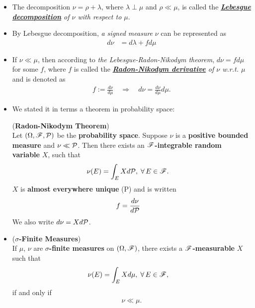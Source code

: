 \documentclass[11pt]{article}
\begin{document}
\begin{itemize}
\item
\begin{definition}
 The decomposition $\nu= \rho + \lambda$, where $\lambda \perp \mu$ and $\rho\ll \mu$, is called the \emph{\textbf{\underline{Lebesgue} \underline{decomposition}} of $\nu$ with respect to $\mu$}.
 \end{definition}

  \item \begin{remark} By Lebesgue decomposition, \emph{a signed measure} $\nu$ can be represented as
 \begin{align*}
 d\nu &= d\lambda + fd\mu 
 \end{align*}
 \end{remark}

\item \begin{definition}
If $\nu \ll \mu$, then according to \emph{the Lebesgue-Radon-Nikodym theorem}, $d\nu = f d\mu$ for some $f$, where $f$ is called the \emph{\underline{\textbf{Radon-Nikodym derivative}} of $\nu$ w.r.t. $\mu$} and is denoted as
\begin{align*}
f := \frac{d\nu}{ d\mu} \quad \Rightarrow \quad d\nu =  \frac{d\nu}{ d\mu} d\mu.
\end{align*}
 \end{definition}
 
 \item We stated it in terms a theorem in probability space: 
\begin{theorem}  (\textbf{Radon-Nikodym Theorem}) \citep{resnick2013probability} \\
Let $(\Omega, {\mathscr F}, {\mathcal P})$ be the \textbf{probability space}. Suppose $\nu$ is a \textbf{positive bounded measure} and $\nu \ll {\mathcal P}$. Then there exists
an \textbf{${\mathscr F}$-integrable random variable} $X$, such that
\begin{align*}
\nu(E) &= \int_E X d{\mathcal P}, \; \forall \, E \in {\mathscr F}.
\end{align*}
$X$ is \textbf{almost everywhere unique} (P) and is written
\begin{align*}
f &= \frac{d\nu}{d{\mathcal P}}
\end{align*}
We also write $d\nu = Xd{\mathcal P}$.
 \end{theorem}
 
 \item \begin{corollary} (\textbf{$\sigma$-Finite Measures}) \citep{resnick2013probability} \\
 If $\mu$, $\nu$ are \textbf{$\sigma$-finite measures} on $(\Omega, {\mathscr F})$, there exists a \textbf{${\mathscr F}$-measurable} $X$ such that
 \begin{align*}
 \nu(E) &= \int_E X d\mu, \; \forall \, E \in {\mathscr F},
 \end{align*}
if and only if
\begin{align*}
\nu \ll \mu.
\end{align*}
\end{corollary}


\end{itemize}
\end{document}
